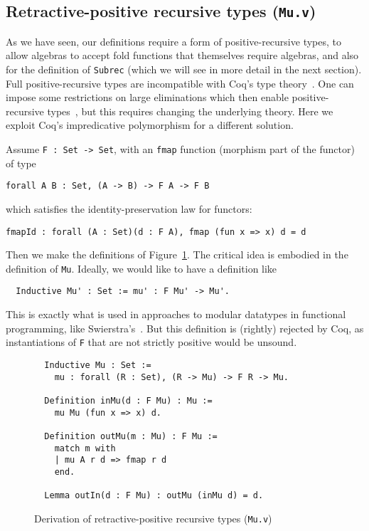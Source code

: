 \documentclass[a4paper,USenglish]{lipics-v2021}
\begin{document}
\subsection{Retractive-positive recursive types (\texttt{Mu.v})}
\label{sec:mu}

As we have seen, our definitions require a form of positive-recursive
types, to allow algebras to accept fold functions that themselves
require algebras, and also for the definition of \verb|Subrec| (which
we will see in more detail in the next section).  Full
positive-recursive types are incompatible with Coq's type
theory~\cite{coquand88}.  One can impose some restrictions on large
eliminations which then enable positive-recursive
types~\cite{blanqui05}, but this requires changing the underlying
theory.  Here we exploit Coq's
impredicative polymorphism for a different solution.

Assume \verb|F : Set -> Set|, with an \verb|fmap| function
(morphism part of the functor) of type
\begin{verbatim}
forall A B : Set, (A -> B) -> F A -> F B
\end{verbatim}
\noindent which satisfies the identity-preservation law for functors:
\begin{verbatim}
fmapId : forall (A : Set)(d : F A), fmap (fun x => x) d = d
\end{verbatim}
\noindent Then we make the definitions of Figure~\ref{fig:mu}.  The critical
idea is embodied in the definition of \verb|Mu|.  Ideally, we would like
to have a definition like
\begin{verbatim}
  Inductive Mu' : Set := mu' : F Mu' -> Mu'.
\end{verbatim}
\noindent This is exactly what is used in approaches to modular
datatypes in functional programming, like
Swierstra's~\cite{swierstra08}.  But this definition is (rightly)
rejected by Coq, as instantiations of
\verb|F| that are not strictly positive would be unsound.

\begin{figure}
\begin{verbatim}
  Inductive Mu : Set := 
    mu : forall (R : Set), (R -> Mu) -> F R -> Mu.

  Definition inMu(d : F Mu) : Mu :=
    mu Mu (fun x => x) d.

  Definition outMu(m : Mu) : F Mu :=
    match m with
    | mu A r d => fmap r d
    end.

  Lemma outIn(d : F Mu) : outMu (inMu d) = d.
\end{verbatim}
\caption{Derivation of retractive-positive recursive types (\texttt{Mu.v})}
\label{fig:mu}
\end{figure}  
\end{document}
